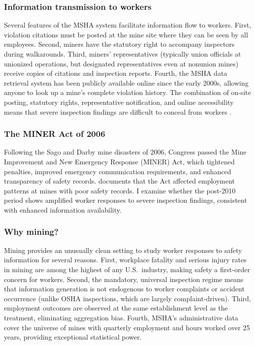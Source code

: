 \documentclass[12pt]{article}
\begin{document}
\subsubsection*{Information transmission to workers} Several features of the MSHA system facilitate information flow to workers. First, violation citations must be posted at the mine site where they can be seen by all employees. Second, miners have the statutory right to accompany inspectors during walkarounds. Third, miners' representatives (typically union officials at unionized operations, but designated representatives even at nonunion mines) receive copies of citations and inspection reports. Fourth, the MSHA data retrieval system has been publicly available online since the early 2000s, allowing anyone to look up a mine's complete violation history. The combination of on-site posting, statutory rights, representative notification, and online accessibility means that severe inspection findings are difficult to conceal from workers \citep{morantz2013coal}.

\subsubsection*{The MINER Act of 2006} Following the Sago and Darby mine disasters of 2006, Congress passed the Mine Improvement and New Emergency Response (MINER) Act, which tightened penalties, improved emergency communication requirements, and enhanced transparency of safety records. \citet{li2022miner} documents that the Act affected employment patterns at mines with poor safety records. I examine whether the post-2010 period shows amplified worker responses to severe inspection findings, consistent with enhanced information availability.

\subsubsection*{Why mining?} Mining provides an unusually clean setting to study worker responses to safety information for several reasons. First, workplace fatality and serious injury rates in mining are among the highest of any U.S.\ industry, making safety a first-order concern for workers. Second, the mandatory, universal inspection regime means that information generation is not endogenous to worker complaints or accident occurrence (unlike OSHA inspections, which are largely complaint-driven). Third, employment outcomes are observed at the same establishment level as the treatment, eliminating aggregation bias. Fourth, MSHA's administrative data cover the universe of mines with quarterly employment and hours worked over 25 years, providing exceptional statistical power.
\end{document}
